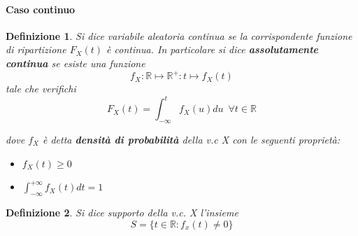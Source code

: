 \documentclass{article}
\newtheorem{definition}{Definizione}[section]
\begin{document}
               
                         
                \paragraph{Caso continuo}
                
                \begin{definition}{} 
                    Si dice variabile aleatoria continua se la corrispondente funzione di ripartizione $F_X(t)$ è continua.
                    In particolare si dice \textbf{assolutamente continua} se esiste una funzione
                    $$
                        f_{X} \colon \mathbb{R} \mapsto \mathbb{R^+}:  t \longmapsto f_X(t)
                    $$
                    tale che verifichi
                    $$
                      F_X(t) =   \int_{-\infty}^{t} f_X(u)du \,\,\,\forall t \in \mathbb{R} 
                    $$
                    
                    dove $f_{X} $ è detta \textbf{densità di probabilità} della v.c X con le seguenti proprietà: 
                        \begin{itemize}
                            \item $f_X(t) \geq 0$
                            \item $\int_{-\infty}^{+\infty} f_X(t)dt =1$
                        \end{itemize}{}
                \end{definition}   
                
                
                
                 \begin{definition}{} Si dice supporto della v.c. X l'insieme 
                 $$S= \{ t \in \mathbb{R}: f_x(t) \neq 0 \}$$
                
                \end{definition}   
                
\end{document}
